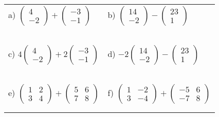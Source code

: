 \documentclass[fontsize=12pt]{scrartcl}
\begin{document}
\begin{tabular}{p{9cm}p{9cm}}
a) $\begin{pmatrix}4\\-2 \end{pmatrix} + \begin{pmatrix}-3\\-1 \end{pmatrix}$
&b) $\begin{pmatrix}14\\-2 \end{pmatrix} - \begin{pmatrix}23\\1 \end{pmatrix}$
\\\\\\
\\\\\\

c) $4\begin{pmatrix}4\\-2 \end{pmatrix} + 2\begin{pmatrix}-3\\-1 \end{pmatrix}$
&d) $-2\begin{pmatrix}14\\-2 \end{pmatrix} - \begin{pmatrix}23\\1 \end{pmatrix}$
\\\\\\
\\\\\\

e) $\begin{pmatrix}1&2\\3&4 \end{pmatrix}+\begin{pmatrix}5&6\\7&8 \end{pmatrix}$
&f) $\begin{pmatrix}1&-2\\3&-4 \end{pmatrix}+\begin{pmatrix}-5&6\\-7&8 \end{pmatrix}$
\\\\\\
\end{tabular}
\end{document}
